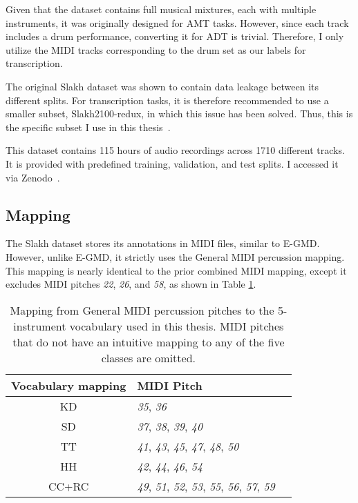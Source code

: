 Given that the dataset contains full musical mixtures, each with multiple instruments, it was originally designed for \gls{AMT} tasks. However, since each track includes a drum performance, converting it for \gls{ADT} is trivial. Therefore, I only utilize the MIDI tracks corresponding to the drum set as our labels for transcription.

The original Slakh dataset was shown to contain data leakage between its different splits. For transcription tasks, it is therefore recommended to use a smaller subset, Slakh2100-redux, in which this issue has been solved. Thus, this is the specific subset I use in this thesis~\cite{manilow_2019_4599666}.

This dataset contains 115 hours of audio recordings across 1710 different tracks. It is provided with predefined training, validation, and test splits. I accessed it via Zenodo~\cite{manilow_2019_4599666}.

\subsection{Mapping}

The Slakh dataset stores its annotations in MIDI files, similar to E-GMD. However, unlike E-GMD, it strictly uses the General MIDI percussion mapping. This mapping is nearly identical to the prior combined MIDI mapping, except it excludes MIDI pitches \textit{22}, \textit{26}, and \textit{58}, as shown in Table \ref{MIDIMapping}.

\begin{table}[H]
    \centering
    \hspace*{-0.6cm}
    \begin{tabular}{c|ll}
        Vocabulary mapping & MIDI Pitch \\
        \hline
        \acrfull{KD} & \textit{35}, \textit{36} \\
        \acrfull{SD} & \textit{37}, \textit{38}, \textit{39}, \textit{40} \\
        \acrfull{TT} & \textit{41}, \textit{43}, \textit{45}, \textit{47}, \textit{48}, \textit{50} \\
        \acrfull{HH} & \textit{42}, \textit{44}, \textit{46}, \textit{54} \\
        \acrfull{CC+RC} & \textit{49}, \textit{51}, \textit{52}, \textit{53}, \textit{55}, \textit{56}, \textit{57}, \textit{59} \\
    \end{tabular}
    \caption{Mapping from General MIDI percussion pitches to the 5-instrument vocabulary used in this thesis. MIDI pitches that do not have an intuitive mapping to any of the five classes are omitted.}
    \label{MIDIMapping}
\end{table}

